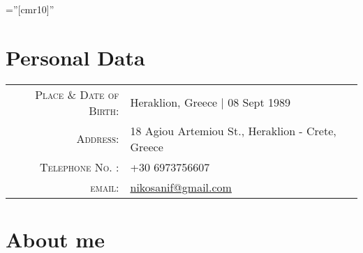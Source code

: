 \documentclass[11pt]{article}
\begin{document}

\font\fb=''[cmr10]'' 

\par{\par}
\par{\par}
\bigskip

\section{Personal Data}

\begin{tabular}{rl}
    \textsc{Place \& Date of Birth:}    & Heraklion, Greece | 08 Sept 1989 \\
    \textsc{Address:}                   & 18 Agiou Artemiou St., Heraklion - Crete, Greece \\
    \textsc{Telephone No. :}            & +30 6973756607 \\
    \textsc{email:}                     & \href{mailto:nikosanif@gmail.com}{nikosanif@gmail.com} \\
\end{tabular}

\section{About me}
\end{document}
